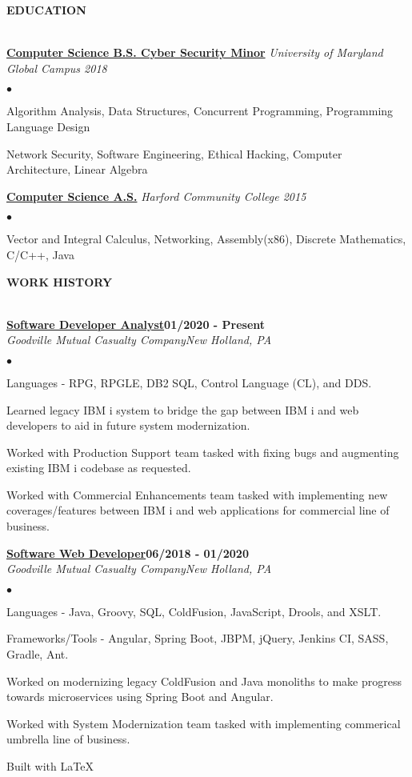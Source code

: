 \documentclass{article}
\newcommand{\lineunder}{
	\vspace*{-4pt}\\ 
	\hspace*{-18pt}\hrulefill \\
}
\newcommand{\header}[1]{
	{\hspace*{-15pt}\vspace*{6pt}\textsc{#1}}\vspace*{-6pt}\lineunder
}
\newcommand{\employer}[4]{
	{\underline{\textbf{#1}}{\hfill\textbf{#2}}\\ 
	\vspace*{2pt}\textit{#3}\hfill \textit{#4}\\}
}
\newcommand{\education}[2]{
	\textbf{\underline{{#1}}} \textit{#2}\vspace*{3pt}
}
\newenvironment{resumecontent}{
	\begin{list}
		{\small$\bullet$}{\topsep 0pt \itemsep -2pt}}{\vspace*{4pt}
	\end{list}
}
\newcommand{\resumeheader}[1]{
	\vspace*{10pt}
	\header{\textbf{#1}}
    \vspace*{5pt}
}
\begin{document}
	\resumeheader{EDUCATION}
		\education {Computer Science B.S. Cyber Security Minor}{University of Maryland Global Campus 2018}
            \begin{resumecontent}
                \item Algorithm Analysis, Data Structures, Concurrent Programming, Programming Language Design
                \item Network Security, Software Engineering, Ethical Hacking, Computer Architecture, Linear Algebra
            \end{resumecontent}
            \vspace*{3pt}
		\education {Computer Science A.S.}{Harford Community College 2015}
            \begin{resumecontent}
                \item Vector and Integral Calculus, Networking, Assembly(x86), Discrete Mathematics, C/C++, Java
            \end{resumecontent}

	\resumeheader{WORK HISTORY}
        \employer{Software Developer Analyst}{01/2020 - Present}{Goodville Mutual Casualty Company}{New Holland, PA}
            \vspace*{2pt}
			\begin{resumecontent}
                \item Languages - RPG, RPGLE, DB2 SQL, Control Language (CL), and DDS.
				\item Learned legacy IBM i system to bridge the gap between IBM i and web developers to aid in future system modernization.
                \item Worked with Production Support team tasked with fixing bugs and augmenting existing IBM i codebase as requested.
                \item Worked with Commercial Enhancements team tasked with implementing new coverages/features between IBM i and web applications for commercial line of business.
			\end{resumecontent}
            \vspace*{4pt}
		\employer{Software Web Developer}{06/2018 - 01/2020}{Goodville Mutual Casualty Company}{New Holland, PA}
            \vspace*{2pt}
			\begin{resumecontent}
                \item Languages - Java, Groovy, SQL, ColdFusion, JavaScript, Drools, and XSLT.
                \item Frameworks/Tools - Angular, Spring Boot, JBPM, jQuery, Jenkins CI, SASS, Gradle, Ant.
				\item Worked on modernizing legacy ColdFusion and Java monoliths to make progress towards microservices using Spring Boot and Angular.
				\item Worked with System Modernization team tasked with implementing commerical umbrella line of business.
			\end{resumecontent}

	\begin{center}
		\small 
		\vspace*{35pt} Built with \LaTeX
	\end{center}
\end{document}
